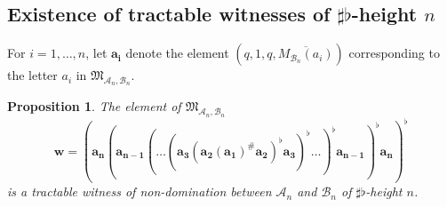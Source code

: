 \documentclass[10pt,a4paper]{amsart}
\newtheorem{prop}[prop]{Proposition}
\theoremstyle{definition}
\numberwithin{equation}{section}
\theoremstyle{remark}
\newcommand{\ideal}{\mathfrak{M}}
\newcommand{\autA}{\mathcal{A}}
\newcommand{\autB}{\mathcal{B}}
\theoremstyle{remark}
\begin{document}
\subsection{Existence of tractable witnesses of \texorpdfstring{$\sharp\flat$}{\#flat}-height \texorpdfstring{$n$}{n}}
\label{section:existence}

For $i=1, \ldots, n$, let $\boldsymbol{a_i}$ denote the element $(q,1,q,\overline{M_{\autB_n}(a_i)})$ corresponding to the letter $a_i$ in $\ideal_{\autA_n,\autB_n}$.

\begin{prop}
\label{prop:sfheightwitnessexists}
The element of $\ideal_{\autA_n,\autB_n}$ \[ \boldsymbol{w} = (\boldsymbol{a_n} (\boldsymbol{a_{n-1}} (\dots (\boldsymbol{a_{3}} ( \boldsymbol{a_{2}} (\boldsymbol{a_{1}})^\#\boldsymbol{a_{2}})^\flat \boldsymbol{a_{3}})^\flat \dots)^\flat \boldsymbol{a_{n-1}})^\flat \boldsymbol{a_{n}})^\flat\]  is a tractable witness of non-domination between $\autA_n$ and $\autB_n$ of $\sharp\flat$-height $n$.
\end{prop}
\end{document}
